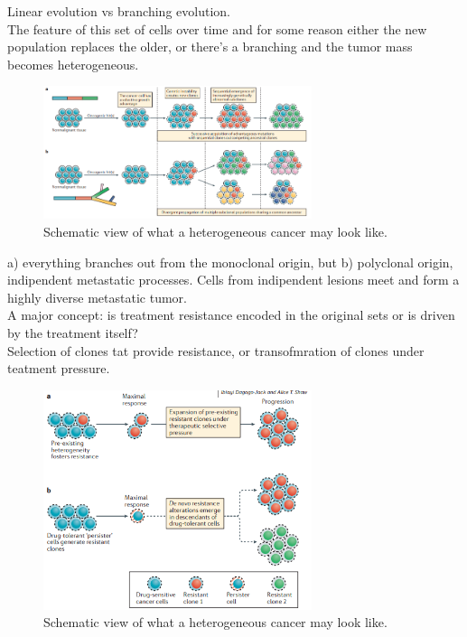 Linear evolution vs branching evolution.\\
The feature of this set of cells over time and for some reason either the new population replaces the older, or there's a branching and the tumor mass becomes heterogeneous.\\
\begin{figure}[htbp!]
	\centering
	\includegraphics[width=0.7\textwidth]{branching.png}
	\caption{\label{fig:branching} Schematic view of what a heterogeneous cancer may look like.}
\end{figure}

a) everything branches out from the monoclonal origin, but b) polyclonal origin, indipendent metastatic processes. Cells from indipendent lesions meet and form a highly diverse metastatic tumor.\\

A major concept: is treatment resistance encoded in the original sets or is driven by the treatment itself?\\
Selection of clones tat provide resistance, or transofmration of clones under teatment pressure. 

\begin{figure}[htbp!]
	\centering
	\includegraphics[width=0.7\textwidth]{response.png}
	\caption{\label{fig:response} Schematic view of what a heterogeneous cancer may look like.}
\end{figure}

